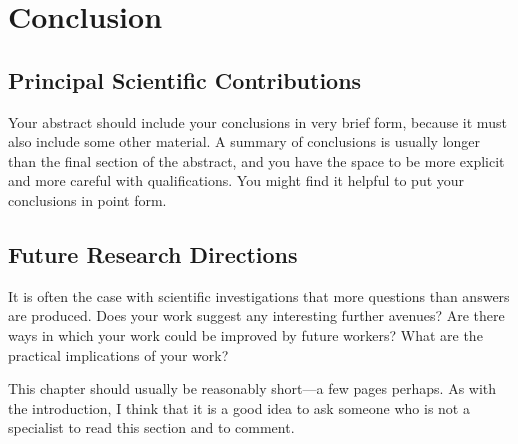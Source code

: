 








\chapter{Conclusion}
\label{chap:conclusion}


\section{Principal Scientific Contributions}
Your abstract should include your conclusions in very brief form, because it must also include some other material. A summary of conclusions is usually longer than the final section of the abstract, and you have the space to be more explicit and more careful with qualifications. You might find it helpful to put your conclusions in point form. 


\section{Future Research Directions}
It is often the case with scientific investigations that more questions than answers are produced. Does your work suggest any interesting further avenues? Are there ways in which your work could be improved by future workers? What are the practical implications of your work? 

This chapter should usually be reasonably short---a few pages perhaps. As with the introduction, I think that it is a good idea to ask someone who is not a specialist to read this section and to comment. 
